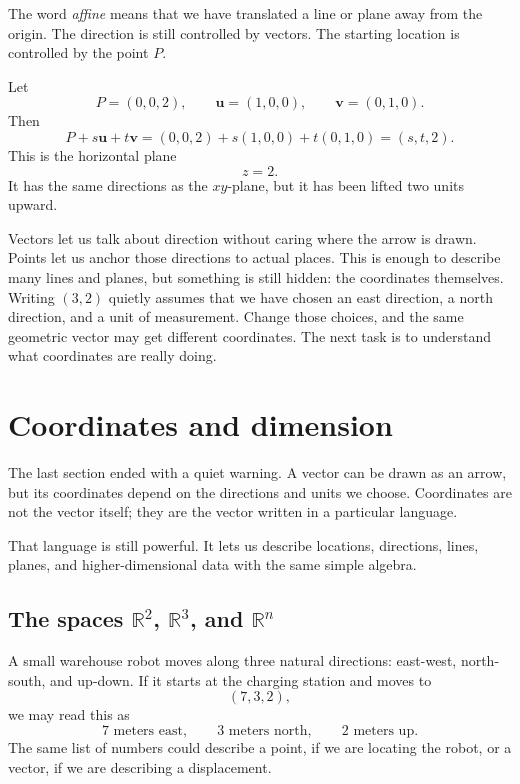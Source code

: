 The word \emph{affine} means that we have translated a line or plane away from the
origin.  The direction is still controlled by vectors.  The starting location is controlled
by the point \(P\).

\begin{example}
Let
\[
    P=(0,0,2), \qquad \mathbf u=(1,0,0), \qquad \mathbf v=(0,1,0).
\]
Then
\[
    P+s\mathbf u+t\mathbf v
    =
    (0,0,2)+s(1,0,0)+t(0,1,0)
    =
    (s,t,2).
\]
This is the horizontal plane
\[
    z=2.
\]
It has the same directions as the \(xy\)-plane, but it has been lifted two units upward.
\end{example}

Vectors let us talk about direction without caring where the arrow is drawn.  Points
let us anchor those directions to actual places.  This is enough to describe many lines
and planes, but something is still hidden: the coordinates themselves.  Writing
\((3,2)\) quietly assumes that we have chosen an east direction, a north direction, and
a unit of measurement.  Change those choices, and the same geometric vector may get
different coordinates.  The next task is to understand what coordinates are really doing.
\section{Coordinates and dimension}

The last section ended with a quiet warning.  A vector can be drawn as an arrow, but
its coordinates depend on the directions and units we choose.  Coordinates are not the
vector itself; they are the vector written in a particular language.

That language is still powerful.  It lets us describe locations, directions, lines, planes,
and higher-dimensional data with the same simple algebra.

\subsection{The spaces \(\mathbb R^2\), \(\mathbb R^3\), and \(\mathbb R^n\)}

A small warehouse robot moves along three natural directions: east-west, north-south,
and up-down.  If it starts at the charging station and moves to
\[
    (7,3,2),
\]
we may read this as
\[
    7 \text{ meters east}, \qquad 3 \text{ meters north}, \qquad 2 \text{ meters up}.
\]
The same list of numbers could describe a point, if we are locating the robot, or a
vector, if we are describing a displacement.

